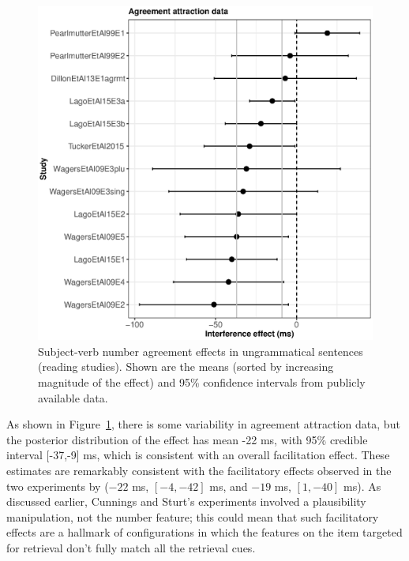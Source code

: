 \documentclass{cambridge7A}\usepackage[]{graphicx}\usepackage[]{color}
\makeatletter
\def\maxwidth{ %
  \ifdim\Gin@nat@width>\linewidth
    \linewidth
  \else
    \Gin@nat@width
  \fi
}
\newenvironment{knitrout}{}{} %
\makeatother
\begin{document}
\begin{figure}[!htbp]
\centering
\begin{knitrout}
\color{fgcolor}

{\centering \includegraphics[width=\maxwidth]{figures/fig-mismatchplot-1} 

}



\end{knitrout}
\caption{Subject-verb number agreement effects in ungrammatical sentences (reading studies). Shown are the means (sorted by increasing magnitude of the effect) and 95\% confidence intervals from publicly available data.}\label{fig:agrmtattrnc01}
\end{figure} 

 As shown in Figure~\ref{fig:agrmtattrnc01}, there is some variability in agreement attraction data, but the posterior distribution of the effect has mean -22 ms, with 95\% credible interval [-37,-9] ms, which is consistent with an overall facilitation effect. These estimates are remarkably consistent with the facilitatory effects observed in the two experiments by \cite{CunningsSturt2018} ($-22$ ms, $[-4,-42]$ ms,  and $-19$ ms, $[1,-40]$ ms). As discussed earlier, Cunnings and Sturt's experiments involved a plausibility manipulation, not the number feature; this could mean that such facilitatory effects are a hallmark of configurations in which the features on the item targeted for retrieval don't fully match all the retrieval cues.
\end{document}
